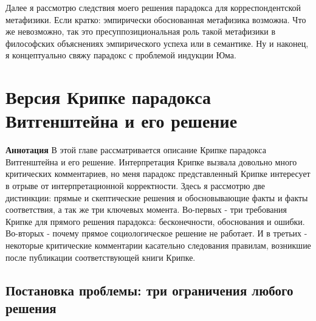 \documentclass{book}
\begin{document}
Далее я рассмотрю следствия моего решения парадокса для корреспондентской метафизики. Если кратко: эмпирически обоснованная метафизика возможна. Что же невозможно, так это пресуппозициональная роль такой метафизики в философских объяснениях эмпирического успеха или в семантике. Ну и наконец, я концептуально свяжу парадокс с проблемой индукции Юма.

\chapter{Версия Крипке парадокса Витгенштейна и его решение}

\textbf{Аннотация} В этой главе рассматривается описание Крипке парадокса Витгенштейна и его решение. Интерпретация Крипке вызвала довольно много критических комментариев, но меня парадокс представленный Крипке интересует в отрыве от интерпретационной корректности. Здесь я рассмотрю две дистинкции: прямые и скептические решения и обосновывающие факты и факты соответствия, а так же три ключевых момента. Во-первых - три требования Крипке для прямого решения парадокса: бесконечности, обоснования и ошибки. Во-вторых - почему прямое социологическое решение не работает. И в третьих - некоторые критические комментарии касательно следования правилам, возникшие после публикации соответствующей книги Крипке.

\section{Постановка проблемы: три ограничения любого решения}
\end{document}
